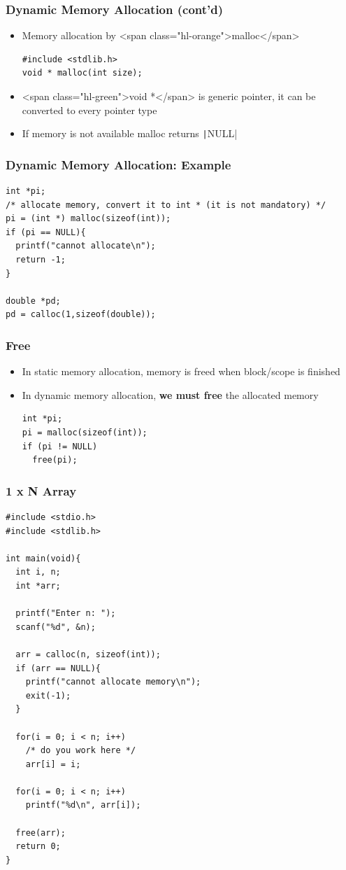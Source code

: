 \documentclass{../c-lecture}
\begin{document}
\begin{frame}[fragile]
  \frametitle{Dynamic Memory Allocation (cont’d)}
  \begin{itemize}
    \item Memory allocation by <span class="hl-orange">malloc</span>
    \begin{verbatim}
#include <stdlib.h>
void * malloc(int size);
    \end{verbatim}
    \item
      <span class="hl-green">void *</span> is generic pointer, it can be
      converted to every pointer type

    \item If memory is not available malloc returns \texttt|NULL|
  \end{itemize}
\end{frame}

\begin{frame}[fragile]
  \frametitle{Dynamic Memory Allocation: Example}
  \begin{verbatim}
int *pi;
/* allocate memory, convert it to int * (it is not mandatory) */
pi = (int *) malloc(sizeof(int));
if (pi == NULL){
  printf("cannot allocate\n");
  return -1;
}

double *pd;
pd = calloc(1,sizeof(double));
  \end{verbatim}
\end{frame}

\begin{frame}[fragile]
  \frametitle{Free}
  \begin{itemize}
    \item
      In static memory allocation, memory is freed when block/scope is finished

    \item
      In dynamic memory allocation,
      \textbf{\color{Orange} we must free} the allocated memory

    \begin{verbatim}
int *pi;
pi = malloc(sizeof(int));
if (pi != NULL)
  free(pi);
    \end{verbatim}
  \end{itemize}
\end{frame}

\begin{frame}[fragile]
  \frametitle{1 x N Array}
  \begin{verbatim}
#include <stdio.h>
#include <stdlib.h>

int main(void){
  int i, n;
  int *arr;

  printf("Enter n: ");
  scanf("%d", &n);

  arr = calloc(n, sizeof(int));
  if (arr == NULL){
    printf("cannot allocate memory\n");
    exit(-1);
  }

  for(i = 0; i < n; i++)
    /* do you work here */
    arr[i] = i;

  for(i = 0; i < n; i++)
    printf("%d\n", arr[i]);

  free(arr);
  return 0;
}
  \end{verbatim}
\end{frame}
\end{document}
